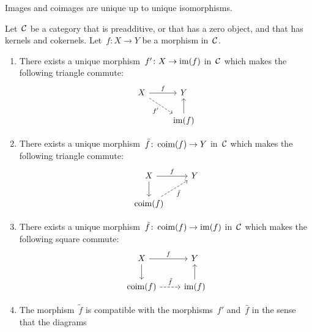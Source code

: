 \begin{remarknonum}
  Images and coimages are unique up to unique isomorphisms.
\end{remarknonum}


\begin{lemma}
  \label{canonical factorization}
  Let~$\mathcal{C}$ be a category that is preadditive, or that has a zero object, and that has kernels and cokernels.
  Let~$f \colon X \to Y$ be a morphism in~$\mathcal{C}$.
  \begin{enumerate}
    \item
      \label{restriction to image}
      There exists a unique morphism~$f' \colon X \to \operatorname{im}(f)$ in~$\mathcal{C}$ which makes the following triangle commute:
      \[
        \begin{tikzcd}
            X
            \arrow{r}[above]{f}
            \arrow[dashed]{dr}[below left]{f'}
          & Y
          \\
            {}
          & \im(f)
            \arrow{u}
        \end{tikzcd}
      \]
    \item
      There exists a unique morphism~$\bar{f} \colon \operatorname{coim}(f) \to Y$ in~$\mathcal{C}$ which makes the following triangle commute:
      \[
        \begin{tikzcd}
            X
            \arrow{r}[above]{f}
            \arrow{d}
          & Y
          \\
            \coim(f)
            \arrow[dashed]{ur}[below right]{\bar{f}}
          & {}
        \end{tikzcd}
      \]
    \item
      There exists a unique morphism~$\tilde{f} \colon \operatorname{coim}(f) \to \operatorname{im}(f)$ in~$\mathcal{C}$ which makes the following square commute:
      \begin{equation}
        \label{canonical morphism from coim to im}
        \begin{tikzcd}
            X
            \arrow{r}[above]{f}
            \arrow{d}
          & Y
          \\
            \coim(f)
            \arrow[dashed]{r}[above]{\tilde{f}}
          & \im(f)
            \arrow{u}
        \end{tikzcd}
      \end{equation}
    \item
      The morphism~$\tilde{f}$ is compatible with the morphisms~$f'$ and~$\bar{f}$ in the sense that the diagrams
      \begin{equation}

\end{equation}
\end{enumerate}
\end{lemma}

